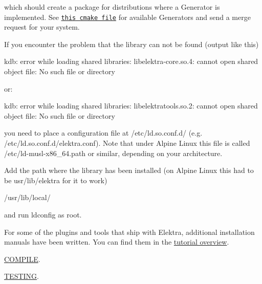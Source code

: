 which should create a package for distributions where a Generator is implemented. See \href{/home/jenkins/workspace/libelektra-release/scripts/cmake/ElektraPackaging.cmake}{\tt this cmake file} for available Generators and send a merge request for your system.

If you encounter the problem that the library can not be found (output like this)


\begin{DoxyCode}
kdb: error while loading shared libraries:
     libelektra-core.so.4: cannot open shared object file: No such file or directory
\end{DoxyCode}


or\+:


\begin{DoxyCode}
kdb: error while loading shared libraries:
     libelektratools.so.2: cannot open shared object file: No such file or directory
\end{DoxyCode}


you need to place a configuration file at {\ttfamily /etc/ld.so.\+conf.\+d/} (e.\+g. {\ttfamily /etc/ld.so.\+conf.\+d/elektra.conf}). Note that under Alpine Linux this file is called {\ttfamily /etc/ld-\/musl-\/x86\+\_\+64.path} or similar, depending on your architecture.

Add the path where the library has been installed (on Alpine Linux this had to be {\ttfamily usr/lib/elektra} for it to work)


\begin{DoxyCode}
/usr/lib/local/
\end{DoxyCode}


and run {\ttfamily ldconfig} as root.

For some of the plugins and tools that ship with Elektra, additional installation manuals have been written. You can find them in the \hyperlink{md_doc_tutorials_README_doc_tutorials_README_md}{tutorial overview}.


\begin{DoxyItemize}
\item \hyperlink{doc_COMPILE_md}{C\+O\+M\+P\+I\+LE}.
\item \hyperlink{doc_TESTING_md}{T\+E\+S\+T\+I\+NG}. 
\end{DoxyItemize}